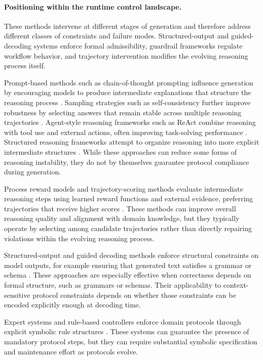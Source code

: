 \documentclass[twocolumn]{article}
\begin{document}
\paragraph{Positioning within the runtime control landscape.}
These methods intervene at different stages of generation and therefore address
different classes of constraints and failure modes. Structured-output and
guided-decoding systems enforce formal admissibility, guardrail frameworks
regulate workflow behavior, and trajectory intervention modifies the evolving
reasoning process itself.


Prompt-based methods such as chain-of-thought prompting influence generation by
encouraging models to produce intermediate explanations that structure the
reasoning process \parencite{wei2022cot}. Sampling strategies such as
self-consistency further improve robustness by selecting answers that remain
stable across multiple reasoning trajectories
\parencite{wang2023selfconsistency}. Agent-style reasoning frameworks such as
ReAct combine reasoning with tool use and external actions, often improving
task-solving performance \parencite{yao2023react}. Structured reasoning
frameworks attempt to organize reasoning into more explicit intermediate
structures \parencite{zhou2025structured}. While these approaches can reduce
some forms of reasoning instability, they do not by themselves guarantee
protocol compliance during generation.

Process reward models and trajectory\hyp{}scoring methods evaluate intermediate
reasoning steps using le\-arned reward functions and external evidence,
preferring trajectories that receive higher scores
\parencite{lightman2023prm800k,yun2025medprm}. These methods can improve overall
reasoning quality and alignment with domain knowledge, but they typically
operate by selecting among candidate trajectories rather than directly repairing
violations within the evolving reasoning process.

Structured-output and guided decoding methods enforce structural constraints on
model outputs, for example ensuring that generated text satisfies a grammar or
schema \parencite{koo2024automata}. These approaches are especially effective
when correctness depends on formal structure, such as grammars or schemas. Their
applicability to context-sensitive protocol constraints depends on whether those
constraints can be encoded explicitly enough at decoding time.

Expert systems and rule-based controllers enforce domain protocols through
explicit symbolic rule structures \parencite{liu2023trustworthy,zhao2024ctg}.
These systems can guarantee the presence of mandatory protocol steps, but they
can require substantial symbolic specification and maintenance effort as
protocols evolve.
\end{document}
